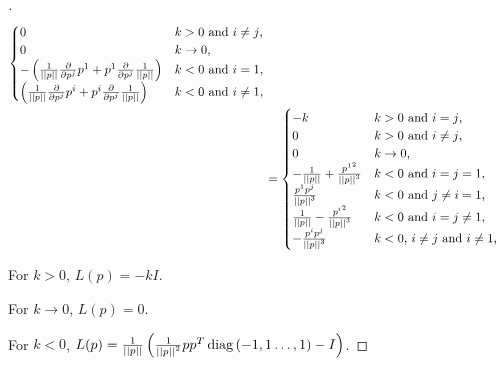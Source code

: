 \documentclass[../main.tex]{subfiles}
\begin{document}
\begin{proof}[]
\begin{align*}
\begin{cases}
              0 & \text{$k>0$ and $i\ne j$,} \\
              0 & \text{$k\to 0$,} \\
              - \left({\frac{1}{\norm{p}}}\frac{\partial}{\partial\tensor{p}{^j}}\tensor{p}{^1} + \tensor{p}{^1}\frac{\partial}{\partial\tensor{p}{^j}}{\frac{1}{\norm{p}}}\right) & \text{$k<0$ and $i=1$,} \\
              \left({\frac{1}{\norm{p}}}\frac{\partial}{\partial\tensor{p}{^j}}\tensor{p}{^i} + \tensor{p}{^i}\frac{\partial}{\partial\tensor{p}{^j}}{\frac{1}{\norm{p}}}\right) & \text{$k<0$ and $i\ne 1$,} \\
            \end{cases} \\
            &= \begin{cases}
                - k & \text{$k>0$ and $i=j$,} \\
                0 & \text{$k>0$ and $i\ne j$,} \\
                0 & \text{$k\to 0$,} \\
                -{\frac{1}{\norm{p}}} + \frac{{\tensor{p}{^1}}^2}{\norm{p}^3} & \text{$k<0$ and $i=j=1$,} \\
                \frac{\tensor{p}{^1}\tensor{p}{^j}}{\norm{p}^3} & \text{$k<0$ and $j\ne i=1$,} \\
                {\frac{1}{\norm{p}}} - \frac{{\tensor{p}{^i}}^2}{\norm{p}^3} & \text{$k<0$ and $i=j\ne1$,} \\
                -\frac{\tensor{p}{^i}\tensor{p}{^j}}{\norm{p}^3} & \text{$k<0$, $i\ne j$ and $i\ne1$,} \\
              \end{cases}
    \end{align*}

    For $k>0$, $L(p)=-k I$.

    For $k\to0$, $L(p)=0$.

    For $k<0$, $L(p)= \frac{1}{\left|\left|{p}\right|\right|} \left(\frac{1}{\left|\left|{p}\right|\right|^2} p p^T \operatorname{diag}{\left(-1,1\dots,1\right)} - I\right)$.
\end{proof}
\begin{lemma}\label{Model:PrincipalCurvature}

\end{lemma}
\end{document}
